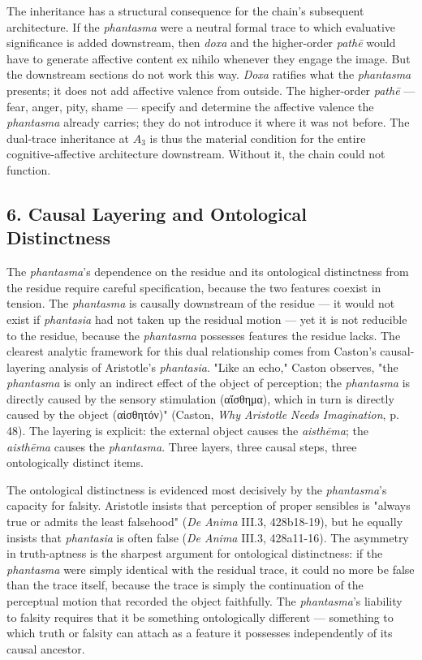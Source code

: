 \documentclass[12pt]{article}
\newcommand{\gk}[1]{{\greekfont #1}}%
\newcommand{\gk}[1]{{\greekfont #1}}%
\newcommand{\gk}[1]{#1}%
\begin{document}
The inheritance has a structural consequence for the chain's subsequent architecture. If the \textit{phantasma} were a neutral formal trace to which evaluative significance is added downstream, then \textit{doxa} and the higher-order \textit{pathē} would have to generate affective content ex nihilo whenever they engage the image. But the downstream sections do not work this way. \textit{Doxa} ratifies what the \textit{phantasma} presents; it does not add affective valence from outside. The higher-order \textit{pathē} --- fear, anger, pity, shame --- specify and determine the affective valence the \textit{phantasma} already carries; they do not introduce it where it was not before. The dual-trace inheritance at $A_3$ is thus the material condition for the entire cognitive-affective architecture downstream. Without it, the chain could not function.

\subsection*{6. Causal Layering and Ontological Distinctness}

The \textit{phantasma}'s dependence on the residue and its ontological distinctness from the residue require careful specification, because the two features coexist in tension. The \textit{phantasma} is causally downstream of the residue --- it would not exist if \textit{phantasia} had not taken up the residual motion --- yet it is not reducible to the residue, because the \textit{phantasma} possesses features the residue lacks. The clearest analytic framework for this dual relationship comes from Caston's causal-layering analysis of Aristotle's \textit{phantasia}. "Like an echo," Caston observes, "the \textit{phantasma} is only an indirect effect of the object of perception; the \textit{phantasma} is directly caused by the sensory stimulation (\gk{αἴσθημα}), which in turn is directly caused by the object (\gk{αἰσθητόν})" (Caston, \textit{Why Aristotle Needs Imagination}, p. 48). The layering is explicit: the external object causes the \textit{aisthēma}; the \textit{aisthēma} causes the \textit{phantasma}. Three layers, three causal steps, three ontologically distinct items.

The ontological distinctness is evidenced most decisively by the \textit{phantasma}'s capacity for falsity. Aristotle insists that perception of proper sensibles is "always true or admits the least falsehood" (\textit{De Anima} III.3, 428b18-19), but he equally insists that \textit{phantasia} is often false (\textit{De Anima} III.3, 428a11-16). The asymmetry in truth-aptness is the sharpest argument for ontological distinctness: if the \textit{phantasma} were simply identical with the residual trace, it could no more be false than the trace itself, because the trace is simply the continuation of the perceptual motion that recorded the object faithfully. The \textit{phantasma}'s liability to falsity requires that it be something ontologically different --- something to which truth or falsity can attach as a feature it possesses independently of its causal ancestor.
\end{document}

